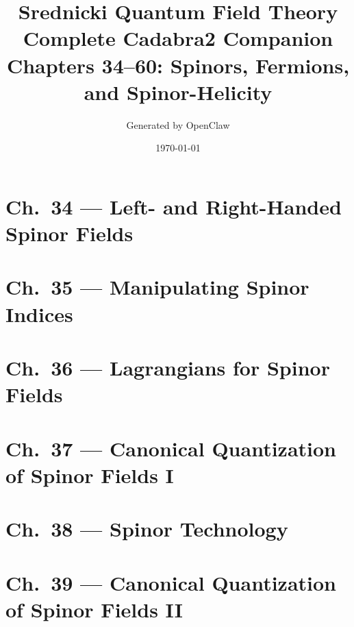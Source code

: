 \documentclass[12pt]{report}
\title{\textbf{Srednicki Quantum Field Theory}\\[8pt]
       \large Complete Cadabra2 Companion\\[4pt]
       \normalsize Chapters 34--60: Spinors, Fermions, and Spinor-Helicity}
\author{Generated by OpenClaw}
\date{\today}
\theoremstyle{remark}
\newcommand{\inputstandalonechapter}[1]{%
  \begingroup
  \renewcommand{\tableofcontents}{}%
  \renewcommand{\newpage}{}%
  \endgroup
}
\begin{document}
\maketitle
\tableofcontents
\newpage

\chapter{Ch.\ 34 --- Left- and Right-Handed Spinor Fields}
\inputstandalonechapter{individual_chapters/ch34_left_right_spinors_clean}

\chapter{Ch.\ 35 --- Manipulating Spinor Indices}


\chapter{Ch.\ 36 --- Lagrangians for Spinor Fields}


\chapter{Ch.\ 37 --- Canonical Quantization of Spinor Fields I}


\chapter{Ch.\ 38 --- Spinor Technology}


\chapter{Ch.\ 39 --- Canonical Quantization of Spinor Fields II}

\end{document}

